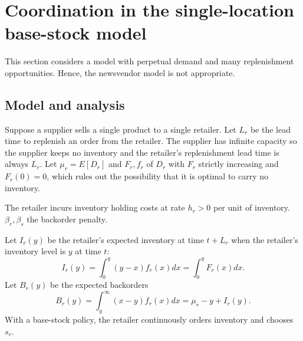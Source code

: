 \newpage
\section{Coordination in the single-location base-stock model}
This section considers a model with perpetual demand and many replenishment opportunities. Hence, the newsvendor model is not appropriate. 

\subsection{Model and analysis}
Suppose a supplier sells a single product to a single retailer. Let $L_r$ be the lead time to replenish an order from the retailer. The supplier has infinite capacity so the supplier keeps no inventory and the retailer's replenishment lead time is always $L_r$. Let $\mu_r=E[D_r]$ and $F_r,f_r$ of $D_r$ with $F_r$ strictly increasing and $F_r(0)=0$, which rules out the possibility that it is optimal to carry no inventory. 

The retailer incurs inventory holding costs at rate $h_r>0$ per unit of inventory. $\beta_r,\beta_s$ the backorder penalty. 

Let $I_r(y)$ be the retailer's expected inventory at time $t+L_r$ when the retailer's inventory level is $y$ at time $t$:
\begin{equation}
    I_r(y)=\int_0^y (y-x)f_r(x)dx=\int_0^y F_r(x)dx.
\end{equation}
Let $B_r(y)$ be the expected backorders
\begin{equation}
    B_r(y)=\int_y^\infty (x-y)f_r(x)dx=\mu_r-y+I_r(y).
\end{equation}
With a base-stock policy, the retailer continuously orders inventory and chooses $s_r$.

